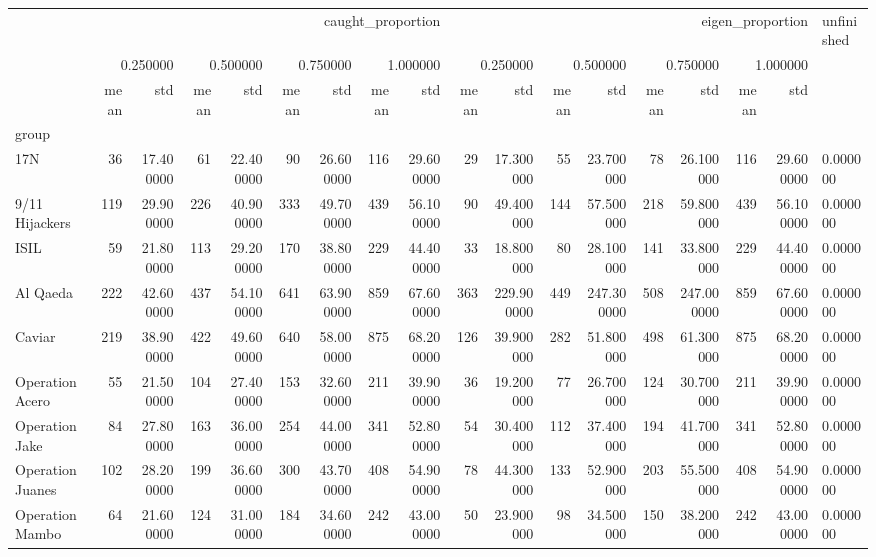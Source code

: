 \begin{tabular}{lrrrrrrrrrrrrrrrrl}
 & \multicolumn{8}{r}{caught_proportion} & \multicolumn{8}{r}{eigen_proportion} & unfinished \\
 & \multicolumn{2}{r}{0.250000} & \multicolumn{2}{r}{0.500000} & \multicolumn{2}{r}{0.750000} & \multicolumn{2}{r}{1.000000} & \multicolumn{2}{r}{0.250000} & \multicolumn{2}{r}{0.500000} & \multicolumn{2}{r}{0.750000} & \multicolumn{2}{r}{1.000000} &  \\
 & mean & std & mean & std & mean & std & mean & std & mean & std & mean & std & mean & std & mean & std &  \\
group &  &  &  &  &  &  &  &  &  &  &  &  &  &  &  &  &  \\
17N & 36 & 17.400000 & 61 & 22.400000 & 90 & 26.600000 & 116 & 29.600000 & 29 & 17.300000 & 55 & 23.700000 & 78 & 26.100000 & 116 & 29.600000 & 0.000000 \\
9/11 Hijackers & 119 & 29.900000 & 226 & 40.900000 & 333 & 49.700000 & 439 & 56.100000 & 90 & 49.400000 & 144 & 57.500000 & 218 & 59.800000 & 439 & 56.100000 & 0.000000 \\
ISIL & 59 & 21.800000 & 113 & 29.200000 & 170 & 38.800000 & 229 & 44.400000 & 33 & 18.800000 & 80 & 28.100000 & 141 & 33.800000 & 229 & 44.400000 & 0.000000 \\
Al Qaeda & 222 & 42.600000 & 437 & 54.100000 & 641 & 63.900000 & 859 & 67.600000 & 363 & 229.900000 & 449 & 247.300000 & 508 & 247.000000 & 859 & 67.600000 & 0.000000 \\
Caviar & 219 & 38.900000 & 422 & 49.600000 & 640 & 58.000000 & 875 & 68.200000 & 126 & 39.900000 & 282 & 51.800000 & 498 & 61.300000 & 875 & 68.200000 & 0.000000 \\
Operation Acero & 55 & 21.500000 & 104 & 27.400000 & 153 & 32.600000 & 211 & 39.900000 & 36 & 19.200000 & 77 & 26.700000 & 124 & 30.700000 & 211 & 39.900000 & 0.000000 \\
Operation Jake & 84 & 27.800000 & 163 & 36.000000 & 254 & 44.000000 & 341 & 52.800000 & 54 & 30.400000 & 112 & 37.400000 & 194 & 41.700000 & 341 & 52.800000 & 0.000000 \\
Operation Juanes & 102 & 28.200000 & 199 & 36.600000 & 300 & 43.700000 & 408 & 54.900000 & 78 & 44.300000 & 133 & 52.900000 & 203 & 55.500000 & 408 & 54.900000 & 0.000000 \\
Operation Mambo & 64 & 21.600000 & 124 & 31.000000 & 184 & 34.600000 & 242 & 43.000000 & 50 & 23.900000 & 98 & 34.500000 & 150 & 38.200000 & 242 & 43.000000 & 0.000000 \\

\end{tabular}
